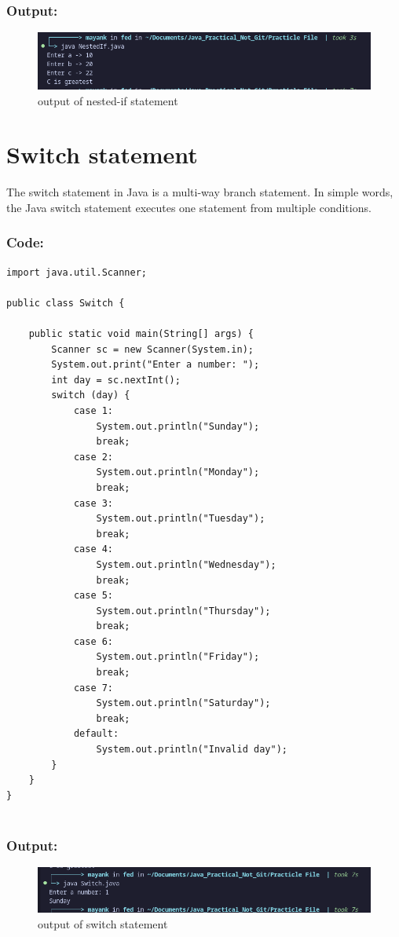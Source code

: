 \documentclass[a4paper,12pt]{article}
\begin{document}
\subsubsection{Output: }
\begin{figure}[H]
    \centering
    \includegraphics[width=0.9\linewidth]{images/NestOut.png}
    \caption{output of nested-if statement}
    \label{fig:sample_image}
\end{figure}

\section{Switch statement}
The switch statement in Java is a multi-way branch statement. In simple words, the Java
switch statement executes one statement from multiple conditions.
\subsubsection{Code: }
\begin{lstlisting}
import java.util.Scanner;

public class Switch {

    public static void main(String[] args) {
        Scanner sc = new Scanner(System.in);
        System.out.print("Enter a number: ");
        int day = sc.nextInt();
        switch (day) {
            case 1:
                System.out.println("Sunday");
                break;
            case 2:
                System.out.println("Monday");
                break;
            case 3:
                System.out.println("Tuesday");
                break;
            case 4:
                System.out.println("Wednesday");
                break;
            case 5:
                System.out.println("Thursday");
                break;
            case 6:
                System.out.println("Friday");
                break;
            case 7:
                System.out.println("Saturday");
                break;
            default:
                System.out.println("Invalid day");
        }
    }
}
    
\end{lstlisting}
\subsubsection{Output: }
\begin{figure}[H]
    \centering
    \includegraphics[width=0.9\linewidth]{images/SwitchOut.png}
    \caption{output of switch statement}
    \label{fig:sample_image}
\end{figure}
\end{document}
